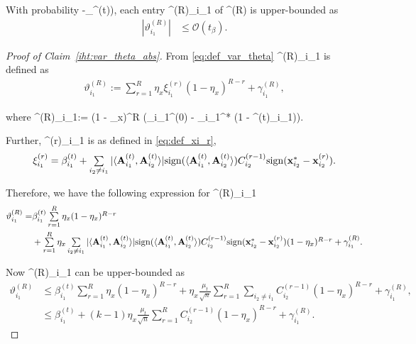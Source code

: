 \documentclass{article}
\newcommand{\sgn}{{\rm sign}}
\def\[#1\]{{$#1$}}
\def\b#1{{\mathbf{#1}}}
\begin{document}
\begin{claim}\label{iht:var_theta_abs}
\begin{em}
	With probability \[(1-\delta_{\beta}^{(t)})\], each entry \[\vartheta^{(R)}_{i_1}\] of \[\vartheta^{(R)}\] is upper-bounded as
	\begin{align*}
	|\vartheta^{(R)}_{i_1}| 
	& \leq  \mathcal{O}(t_{\beta}).
	\end{align*}
	
	\end{em}
\end{claim}
\begin{proof}[Proof of Claim~\ref{iht:var_theta_abs}]
	From \eqref{eq:def_var_theta} \[\vartheta^{(R)}_{i_1}\] is defined as 
	\begin{align*}
	\vartheta^{(R)}_{i_1} :=  \textstyle\sum\limits_{r = 1}^{R }\eta_{x}\xi^{(r)}_{i_1} (1- \eta_x)^{{R} - r} + \gamma^{(R)}_{i_1},
	\end{align*}
	
	where \[ \gamma^{(R)}_{i_1}:= (1 - \eta_{x})^{R} (\b{x}_{i_1}^{(0)}  - \b{x}_{i_1}^* (1 - \lambda^{(t)}_{i_1}))\].  
	
	Further, \[\xi^{(r)}_{i_1}\] is as defined in \eqref{eq:def_xi_r},
	\begin{align*}
	\xi^{(r)}_{i_1} = \beta^{(t)}_{i_1} + \textstyle\sum\limits_{i_2 \neq i_1} |\langle \b{A}^{(t)}_{i_1}, \b{A}^{(t)}_{i_2}\rangle|\sgn(\langle \b{A}^{(t)}_{i_1}, \b{A}^{(t)}_{i_2}\rangle)C_{i_2}^{(r-1)} \sgn(\b{x}_{i_2}^* - \b{x}_{i_2}^{(r)}).
	\end{align*}
	
	Therefore, we have the following expression for \[\vartheta^{(R)}_{i_1}\]
	\begin{align}\label{eq:vartheta_j_delta}
	\vartheta^{(R)}_{i_1} = &\beta^{(t)}_{i_1} \textstyle\sum\limits_{r = 1}^{R}\eta_{x}(1- \eta_x)^{{R} - r} \notag\\
	&+ \textstyle\sum\limits_{r = 1}^{R }\eta_{x}\sum\limits_{i_2 \neq i_1} |\langle \b{A}^{(t)}_{i_1}, \b{A}^{(t)}_{i_2}\rangle|\sgn(\langle \b{A}^{(t)}_{i_1}, \b{A}^{(t)}_{i_2}\rangle)C_{i_2}^{(r-1)} \sgn(\b{x}_{i_2}^* - \b{x}_{i_2}^{(r)})  (1- \eta_x)^{{R} - r} +  \gamma^{(R)}_{i_1}.
	\end{align}
	
	Now \[\vartheta^{(R)}_{i_1}\] can be upper-bounded as
	\begin{align*}
	\vartheta^{(R)}_{i_1} &\leq \textstyle\beta^{(t)}_{i_1} \sum\limits_{r = 1}^{R}\eta_{x}(1- \eta_x)^{{R} - r} + \eta_{x}\tfrac{\mu_t}{\sqrt{n}}\sum\limits_{r = 1}^{R }\sum_{i_2 \neq i_1} C_{i_2}^{(r-1)} (1- \eta_x)^{{R} - r} + \gamma^{(R)}_{i_1},\\
	&\leq  \textstyle\beta^{(t)}_{i_1} + (k-1)\eta_{x}\tfrac{\mu_t}{\sqrt{n}}\sum\limits_{r = 1}^{R } C_{i_2}^{(r-1)} (1- \eta_x)^{{R} - r} + \gamma^{(R)}_{i_1}.
	

\end{align*}
\end{proof}
\end{document}
